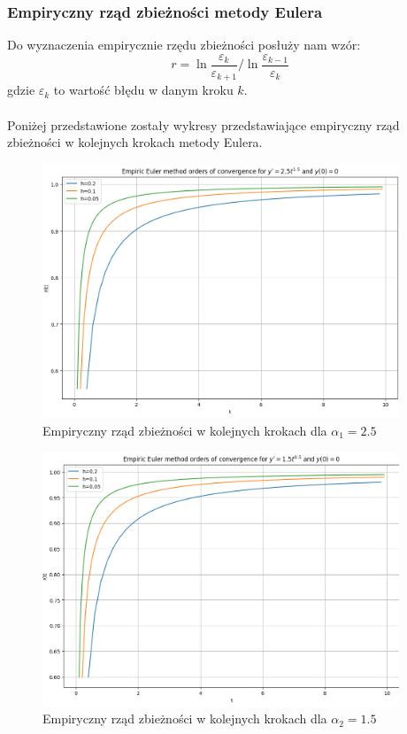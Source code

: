 \documentclass{article}
\begin{document}
\subsubsection{Empiryczny rząd zbieżności metody Eulera}
Do wyznaczenia empirycznie rzędu zbieżności posłuży nam wzór:
$$r = \ln{\frac{\varepsilon_k}{\varepsilon_{k+1}}} / \ln{\frac{\varepsilon_{k-1}}{\varepsilon_{k}}}$$
gdzie $\varepsilon_k$ to wartość błędu w danym kroku $k$.
\\\\
Poniżej przedstawione zostały wykresy przedstawiające empiryczny rząd zbieżności w kolejnych krokach metody Eulera.
\begin{figure}[H]
    \centering
    \includegraphics[width=0.95\textwidth]{4}
    \caption{Empiryczny rząd zbieżności w kolejnych krokach dla $\alpha_1 = 2.5$}
    \label{fig:mesh}
\end{figure}
\begin{figure}[H]
    \centering
    \includegraphics[width=0.95\textwidth]{5}
    \caption{Empiryczny rząd zbieżności w kolejnych krokach dla $\alpha_2 = 1.5$}
    \label{fig:mesh}
\end{figure}
\end{document}
